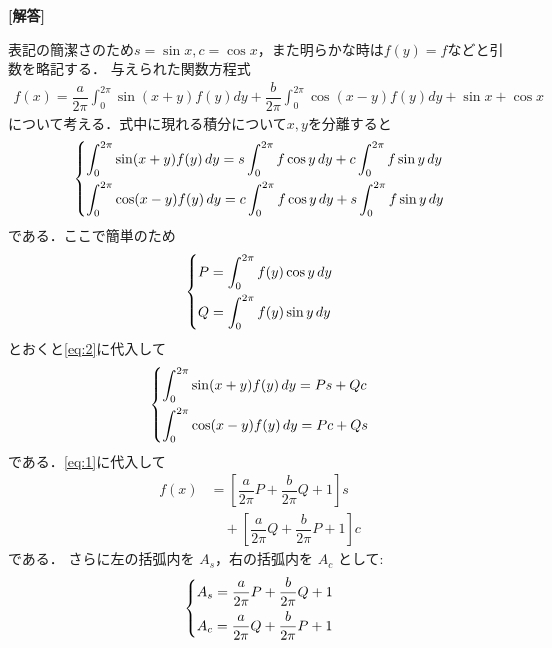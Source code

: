 \documentclass[../../main.tex]{subfiles}
\begin{document}
\begin{oframed}
  
\end{oframed}

{\bf [解答]}

表記の簡潔さのため$s = \sin x, c = \cos x$，また明らかな時は$f(y)=f$などと引数を略記する．
与えられた関数方程式
\begin{align}
  f(x)=\dfrac{a}{2\pi}\int_0^{2\pi}\sin(x+y)f(y)dy+
  \dfrac{b}{2\pi}\int_0^{2\pi}\cos(x-y)f(y)dy+\sin x+\cos x \label{eq:1}
\end{align}
について考える．式中に現れる積分について$x,y$を分離すると
\begin{align}
  \begin{dcases}
    \int_0^{2\pi} \sin(x+y) f(y) \, dy = s \int_0^{2\pi} f\cos y \, dy + c \int_0^{2\pi} f\sin y \, dy \\
    \int_0^{2\pi} \cos(x-y) f(y) \, dy = c \int_0^{2\pi} f\cos y \, dy + s \int_0^{2\pi} f\sin y \, dy
  \end{dcases} \label{eq:2}
\end{align}
である．ここで簡単のため
\begin{align}
  \begin{dcases}
    P = \int_0^{2\pi} f(y)\cos y \, dy \\
    Q = \int_0^{2\pi} f(y)\sin y \, dy \\
  \end{dcases} \label{eq:3}
\end{align}
とおくと\cref{eq:2}に代入して
\begin{align}
  \begin{dcases}
    \int_0^{2\pi} \sin(x+y) f(y) \, dy = Ps+Qc \\
    \int_0^{2\pi} \cos(x-y) f(y) \, dy = Pc+Qs
  \end{dcases} \label{eq:4}
\end{align}
である．\cref{eq:1}に代入して
\begin{align}
  f(x)
  &= \left[ \dfrac{a}{2\pi} P + \dfrac{b}{2\pi} Q + 1 \right] s \\
  &\quad + \left[ \dfrac{a}{2\pi} Q + \dfrac{b}{2\pi} P + 1 \right] c  \label{eq:5}
\end{align}
である．
さらに左の括弧内を $A_{s}$，右の括弧内を $A_{c}$ として:
\begin{align}
  \begin{dcases}
    A_{s} = \dfrac{a}{2\pi} P + \dfrac{b}{2\pi} Q + 1  \\
    A_{c} = \dfrac{a}{2\pi} Q + \dfrac{b}{2\pi} P + 1
  \end{dcases} \label{eq:6}
\end{align}
\end{document}
